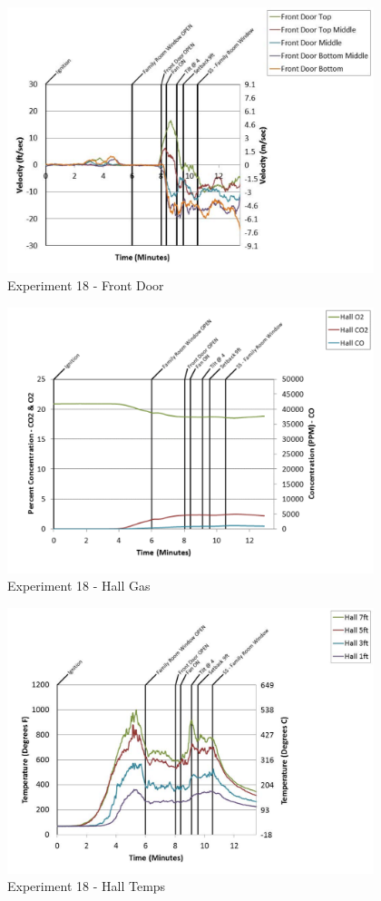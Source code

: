 \documentclass{article}
\begin{document}
\begin{appendices}
	\begin{figure}[h!]
		\centering
		\includegraphics[height=3.05in]{0_Images/Results_Charts/Exp_18_Charts/FrontDoor.pdf}
		\caption{Experiment 18 - Front Door}
	\end{figure}
 
	\clearpage

	\begin{figure}[h!]
		\centering
		\includegraphics[height=3.05in]{0_Images/Results_Charts/Exp_18_Charts/HallGas.pdf}
		\caption{Experiment 18 - Hall Gas}
	\end{figure}
 

	\begin{figure}[h!]
		\centering
		\includegraphics[height=3.05in]{0_Images/Results_Charts/Exp_18_Charts/HallTemps.pdf}
		\caption{Experiment 18 - Hall Temps}
	\end{figure}
 

\end{appendices}
\end{document}
